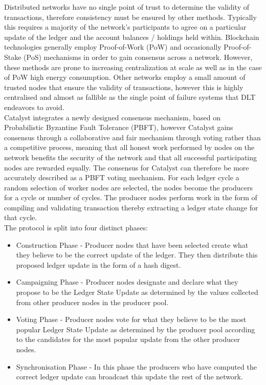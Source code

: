 Distributed networks have no single point of trust to determine the validity of transactions, therefore consistency must be ensured by other methods. Typically this requires a majority of the network's participants to agree on a particular update of the ledger and the account balances / holdings held within. Blockchain technologies generally employ Proof-of-Work (PoW) and occasionally Proof-of-Stake (PoS) mechanisms in order to gain consensus across a network. However, these methods are prone to increasing centralization at scale as well as in the case of PoW high energy consumption. Other networks employ a small amount of trusted nodes that ensure the validity of transactions, however this is highly centralised and almost as fallible as the single point of failure systems that DLT endeavors to avoid. \\

Catalyst integrates a newly designed consensus mechanism, based on Probabilistic Byzantine Fault Tolerance (PBFT), however Catalyst gains consensus through a collaborative and fair mechanism through voting rather than a competitive process, meaning that all honest work performed by nodes on the network benefits the security of the network and that all successful participating nodes are rewarded equally. The consensus for Catalyst can therefore be more accurately described as a PBFT voting mechanism. For each ledger cycle a random selection of worker nodes are selected, the nodes become the producers for a cycle or number of cycles. The producer nodes perform work in the form of compiling and validating transaction thereby extracting a ledger state change for that cycle. \\


The protocol is split into four distinct phases:

\begin{itemize}

\item Construction Phase - Producer nodes that have been selected create what they believe to be the correct update of the ledger. They then distribute this proposed ledger update in the form of a hash digest.
\item Campaigning Phase - Producer nodes designate and declare what they propose to be the Ledger State Update as determined by the values collected from other producer nodes in the producer pool.
\item Voting Phase - Producer nodes vote for what they believe to be the most popular Ledger State Update as determined by the producer pool according to the candidates for the most popular update from the other producer nodes.
\item Synchronisation Phase - In this phase the producers who have computed the correct ledger update can broadcast this update the rest of the network.

\end{itemize}

